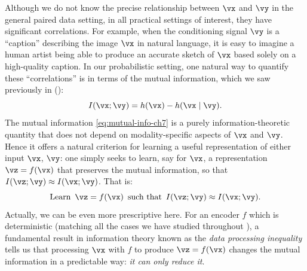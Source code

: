 \documentclass[../../book-main.tex]{subfiles}
\begin{document}
Although we do not know the precise relationship between $\vx$ and $\vy$ in the
general paired data setting, in all practical settings of interest, they have
significant correlations. For example, when the conditioning signal $\vy$ is
a ``caption'' describing the image $\vx$ in natural language, it is easy to
imagine a human artist being able to produce an accurate sketch of $\vx$ based
solely on a high-quality caption.
In our probabilistic setting, one natural way to quantify these
``correlations'' is in terms of the mutual information, which we saw previously
in  ():
\begin{equation}\label{eq:mutual-info-ch7}
    I(\vx; \vy) = h(\vx) - h(\vx \mid \vy).
\end{equation}
The mutual information \eqref{eq:mutual-info-ch7} is a purely
information-theoretic quantity that does not depend on modality-specific aspects
of $\vx$ and $\vy$.
Hence it offers a natural criterion for learning a useful representation of
either input $\vx$, $\vy$: one simply seeks to learn, say for $\vx$,
a representation $\vz = f(\vx)$ that preserves the mutual information, so that
$I(\vz; \vy) \approx I(\vx; \vy)$.
That is:
\begin{equation}\label{eq:infomax-x-abstract}
    \text{Learn} \enspace \vz = f(\vx) \enspace \text{such that} \enspace I(\vz;
    \vy) \approx I(\vx; \vy).
\end{equation}
Actually, we can be even more prescriptive here. For an encoder $f$ which is
deterministic (matching all the cases we have studied throughout
), a fundamental result
in information theory known as the \textit{data processing inequality} tells us
that processing $\vx$ with $f$ to produce $\vz = f(\vx)$ changes the mutual
information in a predictable way: \textit{it can only reduce it}.
\end{document}
